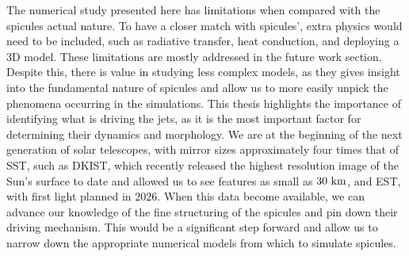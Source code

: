 %
The numerical study presented here has limitations when compared with the spicules actual nature. To have a closer match with spicules', extra physics would need to be included, such as radiative transfer, heat conduction, and deploying a 3D model. These limitations are mostly addressed in the future work section. Despite this, there is value in studying less complex models, as they gives insight into the fundamental nature of spicules and allow us to more easily unpick the phenomena occurring in the simulations. This thesis highlights the importance of identifying what is driving the jets, as it is the most important factor for determining their dynamics and morphology. We are at the beginning of the next generation of solar telescopes, with mirror sizes approximately four times that of SST, such as DKIST, which recently released the highest resolution image of the Sun's surface to date and allowed us to see features as small as $30~\rm{km}$, and EST, with first light planned in $2026$. When this data become available, we can advance our knowledge of the fine structuring of the spicules and pin down their driving mechanism. This would be a significant step forward and allow us to narrow down the appropriate numerical models from which to simulate spicules. 
